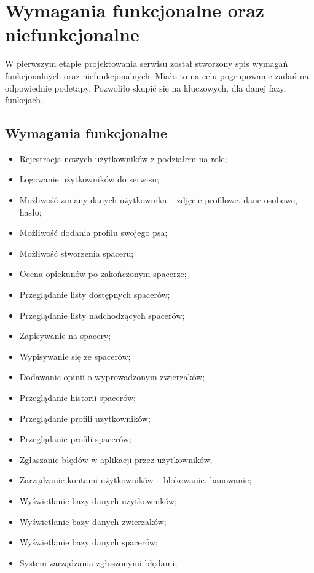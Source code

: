 \section{Wymagania funkcjonalne oraz niefunkcjonalne}

W pierwszym etapie projektowania serwisu został stworzony spis wymagań funkcjonalnych oraz niefunkcjonalnych. Miało to na celu pogrupowanie zadań na odpowiednie podetapy. Pozwoliło skupić się na kluczowych, dla danej fazy, funkcjach.
\subsection{Wymagania funkcjonalne}
\begin{itemize}
    \item Rejestracja nowych użytkowników z podziałem na role;
    \item Logowanie użytkowników do serwisu;
    \item Możliwość zmiany danych użytkownika -- zdjęcie profilowe, dane osobowe, hasło;
    \item Możliwość dodania profilu swojego psa;
    \item Możliwość stworzenia spaceru;
    \item Ocena opiekunów po zakończonym spacerze;
    \item Przeglądanie listy dostępnych spacerów;
    \item Przeglądanie listy nadchodzących spacerów;
    \item Zapisywanie na spacery;
    \item Wypisywanie się ze spacerów;
    \item Dodawanie opinii o wyprowadzonym zwierzaków;
    \item Przeglądanie historii spacerów;
    \item Przeglądanie profili uzytkowników;
    \item Przeglądanie profili spacerów;
    \item Zgłaszanie błędów w aplikacji przez użytkowników;
    \item Zarządzanie kontami użytkowników -- blokowanie, banowanie;
    \item Wyświetlanie bazy danych użytkowników;
    \item Wyświetlanie bazy danych zwierzaków;
    \item Wyświetlanie bazy danych spacerów;
    \item System zarządzania zgłoszonymi błędami;
\end{itemize}
